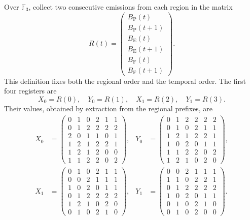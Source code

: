 Over \(\mathbb F_3\), collect two consecutive emissions from each region
in the matrix
\begin{equation}
 R(t)=
 \begin{pmatrix}
 B_{\mathrm P}(t)\\ B_{\mathrm P}(t+1)\\
 B_{\mathrm E}(t)\\ B_{\mathrm E}(t+1)\\
 B_{\mathrm F}(t)\\ B_{\mathrm F}(t+1)
 \end{pmatrix}.
 \label{eq:df-registro-matricial}
\end{equation}
This definition fixes both the regional order and the temporal order.
The first four registers are
\[
 X_0=R(0),\quad Y_0=R(1),\quad X_1=R(2),\quad Y_1=R(3).
\]
Their values, obtained by extraction from the regional prefixes, are
\begin{align*}
 X_0&=\begin{pmatrix}
0&1&0&2&1&1\\0&1&2&2&2&2\\2&0&1&1&0&1\\
1&2&1&2&2&1\\1&2&1&2&0&0\\1&1&2&2&0&2
\end{pmatrix},&
 Y_0&=\begin{pmatrix}
0&1&2&2&2&2\\0&1&0&2&1&1\\1&2&1&2&2&1\\
1&0&2&0&1&1\\1&1&2&2&0&2\\1&2&1&0&2&0
\end{pmatrix},\\[1ex]
 X_1&=\begin{pmatrix}
0&1&0&2&1&1\\0&0&2&1&1&1\\1&0&2&0&1&1\\
0&1&2&2&2&2\\1&2&1&0&2&0\\0&1&0&2&1&0
\end{pmatrix},&
 Y_1&=\begin{pmatrix}
0&0&2&1&1&1\\1&1&0&2&2&1\\0&1&2&2&2&2\\
1&0&2&0&1&1\\0&1&0&2&1&0\\0&1&0&2&0&0
\end{pmatrix}.
\end{align*}


